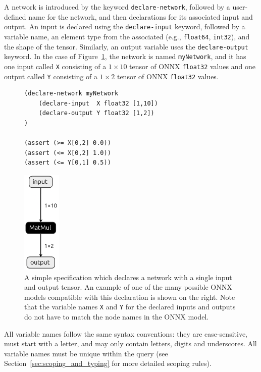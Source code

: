 A network is introduced by the keyword \texttt{declare-network}, followed by a user-defined name for the network, and then declarations for its associated input and output. 
An input is declared using the \texttt{declare-input} keyword, followed by a variable name, an element type from the associated \networkTheory{} (e.g., \texttt{float64}, \texttt{int32}), 
and the shape of the tensor. Similarly, an output variable uses the \texttt{declare-output} keyword. In the case of Figure~\ref{fig:simple-query}, the network is named \texttt{myNetwork}, and it has one input called \texttt{X} consisting of a $1 \times 10$ tensor of ONNX \texttt{float32} values and one output called \texttt{Y} consisting of a $1 \times 2$ tensor of ONNX \texttt{float32} values. 
\begin{figure}[t]
    \begin{minipage}[c]{0.62\textwidth}
        \begin{lstlisting}[style=lbnf]
(declare-network myNetwork
    (declare-input  X float32 [1,10])
    (declare-output Y float32 [1,2])
)

(assert (>= X[0,2] 0.0))
(assert (<= X[0,2] 1.0))
(assert (<= Y[0,1] 0.5))\end{lstlisting}
    \end{minipage}%
    \begin{minipage}[c]{0.35\textwidth}
        \centering
        \includegraphics[height=5cm]{imgs/simple_net.onnx.png}
    \end{minipage}
    \caption{A simple \vnnlib{} specification which declares a network with a single input and output tensor. An example of one of the many possible ONNX models compatible with this declaration is shown on the right. Note that the variable names \texttt{X} and \texttt{Y} for the declared inputs and outputs do not have to match the node names in the ONNX model.}
    \label{fig:simple-query}
\end{figure}


All variable names follow the same syntax conventions: they are case-sensitive, must start with a letter, and may only contain letters, digits and underscores. All variable names must be unique within the query (see Section~\ref{sec:scoping_and_typing} for more detailed scoping rules). 


